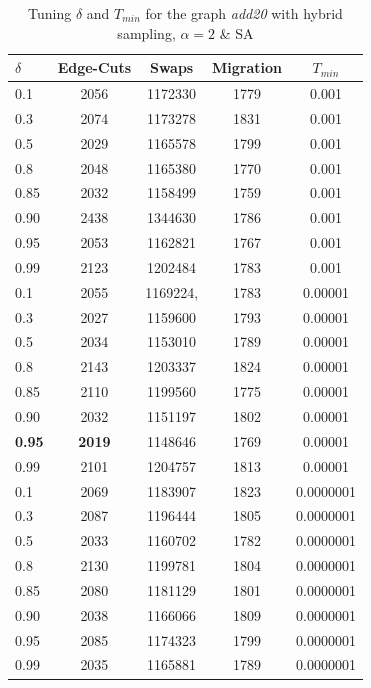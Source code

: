 \documentclass[a4paper, 11pt]{article}
\begin{document}
	\begin{table}
		\centering
		\begin{tabular}{|l|c|c|c|c|} 
			\hline
			$\delta$ & Edge-Cuts &  Swaps & Migration  & $T_{min}$  \\\hline
		 0.1 &  2056 & 1172330 & 1779 & 0.001\\
		0.3 & 2074 & 1173278 & 1831 & 0.001\\
		 0.5 & 2029 & 1165578 & 1799 & 0.001\\
		0.8 & 2048 & 1165380 & 1770 & 0.001\\
		0.85 & 2032 & 1158499 & 1759 & 0.001\\
		0.90 & 2438 & 1344630 & 1786 & 0.001\\
		0.95 & 2053 & 1162821 & 1767 & 0.001\\
		 0.99 & 2123 & 1202484 & 1783 & 0.001\\
		 0.1 & 2055 & 1169224, & 1783 & 0.00001\\
		  0.3 & 2027 & 1159600 & 1793 & 0.00001\\
		  0.5 & 2034 & 1153010 & 1789 & 0.00001\\
		  0.8 & 2143 & 1203337 & 1824 & 0.00001\\
		  0.85 & 2110 & 1199560 & 1775 & 0.00001\\
		 0.90 &  2032 & 1151197 & 1802 & 0.00001\\
		 \textbf{0.95} & \textbf{2019} &1148646 & 1769 & 0.00001\\
		 0.99  & 2101 & 1204757 & 1813& 0.00001\\
		 0.1 & 2069 & 1183907 & 1823 & 0.0000001\\
		 0.3  & 2087 & 1196444 & 1805 & 0.0000001\\
		 0.5  & 2033 & 1160702 & 1782 & 0.0000001\\
		 0.8 & 2130 & 1199781 & 1804 & 0.0000001\\
		 0.85 & 2080 & 1181129 & 1801 & 0.0000001\\
		 0.90 &  2038 & 1166066 & 1809 & 0.0000001\\
		  0.95 & 2085 & 1174323 & 1799 & 0.0000001\\
		 0.99 & 2035 & 1165881 & 1789 & 0.0000001\\
			\hline
		\end{tabular}
		\caption{Tuning $\delta$ and $T_{min}$ for the graph \textit{add20} with hybrid sampling, $\alpha=2$ \& SA}
		\label{tab:add20_delta_2}
\end{table}
\end{document}
